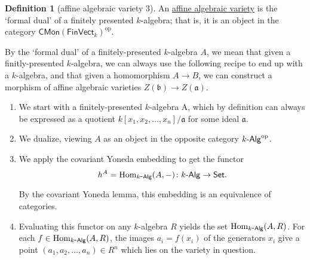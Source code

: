 \documentclass[a4paper,10pt]{scrreprt}
\newcommand{\defn}[1]{\ul{#1}}
\newcommand{\Hom}{\mathrm{Hom}}
\def\mhyp{{\hbox{-}}}
\theoremstyle{definition}
\newtheorem{definition}{Definition}[section]
\theoremstyle{plain}
\theoremstyle{remark}
\begin{document}
\begin{definition}[affine algebraic variety 3]
  \label{def:affinealgebraicvariety3}
  An \defn{affine algebraic variety} is the `formal dual' of a finitely presented $k$-algebra; that is, it is an object in the category $\mathsf{CMon}(\mathsf{FinVect}_{k})^{\mathrm{op}}$.

  By the `formal dual' of a finitely-presented $k$-algebra $A$, we mean that given a finitly-presented $k$-algebra, we can always use the following recipe to end up with a $k$-algebra, and that given a homomorphism $A \to B$, we can construct a morphism of affine algebraic varieties $Z(\mathfrak{b}) \to Z(\mathfrak{a})$.
  \begin{enumerate}
    \item We start with a finitely-presented $k$-algebra A, which by definition can always be expressed as a quotient $k[x_{1}, x_{2}, \ldots, x_{n}]/\mathfrak{a}$ for some ideal $\mathfrak{a}$.

    \item We dualize, viewing $A$ as an object in the opposite category $k\mhyp\mathsf{Alg}^{\mathrm{op}}$.
      
    \item We apply the covariant Yoneda embedding to get the functor 
      \begin{equation*}
        h^{A} = \Hom_{k\mhyp\mathsf{Alg}}(A, -)\colon k\mhyp\mathsf{Alg} \to \mathsf{Set}.
      \end{equation*}

      By the covariant Yoneda lemma, this embedding is an equivalence of categories.

    \item Evaluating this functor on any $k$-algebra $R$ yields the set $\Hom_{k\mhyp\mathsf{Alg}}(A, R)$. For each $f \in \Hom_{k\mhyp\mathsf{Alg}}(A, R)$, the images $a_{i} = f(x_{i})$ of the generators $x_{i}$ give a point $(a_{1}, a_{2}, \ldots, a_{n}) \in R^{n}$ which lies on the variety in question.
  \end{enumerate}
\end{definition}
\end{document}
